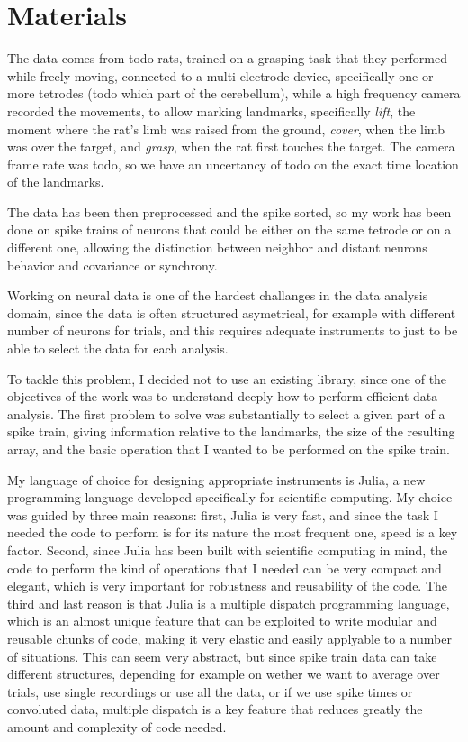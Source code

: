 \section{Materials}

The data comes from todo rats, trained on a grasping task that they performed while freely moving, connected to a multi-electrode device, specifically one or more tetrodes (todo which part of the cerebellum), while a high frequency camera recorded the movements, to allow marking landmarks, specifically \emph{lift}, the moment where the rat's limb was raised from the ground, \emph{cover}, when the limb was over the target, and \emph{grasp}, when the rat first touches the target. The camera frame rate was todo, so we have an uncertancy of todo on the exact time location of the landmarks.

The data has been then preprocessed and the spike sorted, so my work has been done on spike trains of neurons that could be either on the same tetrode or on a different one, allowing the distinction between neighbor and distant neurons behavior and covariance or synchrony.


Working on neural data is one of the hardest challanges in the data analysis domain, since the data is often structured asymetrical, for example with different number of neurons for trials, and this requires adequate instruments to just to be able to select the data for each analysis.

To tackle this problem, I decided not to use an existing library, since one of the objectives of the work was to understand deeply how to perform efficient data analysis. 
The first problem to solve was substantially to select a given part of a spike train, giving information relative to the landmarks, the size of the resulting array, and the basic operation that I wanted to be performed on the spike train.

My language of choice for designing appropriate instruments is Julia, a new programming language developed specifically for scientific computing. My choice was guided by three main reasons: first, Julia is very fast, and since the task I needed the code to perform is for its nature the most frequent one, speed is a key factor. Second, since Julia has been built with scientific computing in mind, the code to perform the kind of operations that I needed can be very compact and elegant, which is very important for robustness and reusability of the code. The third and last reason is that Julia is a multiple dispatch programming language, which is an almost unique feature that can be exploited to write modular and reusable chunks of code, making it very elastic and easily applyable to a number of situations. This can seem very abstract, but since spike train data can take different structures, depending for example on wether we want to average over trials, use single recordings or use all the data, or if we use spike times or convoluted data, multiple dispatch is a key feature that reduces greatly the amount and complexity of code needed.

